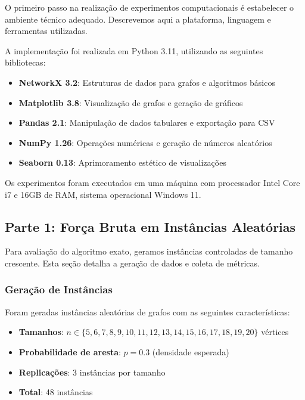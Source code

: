 \documentclass[12pt]{article}
\begin{document}
O primeiro passo na realização de experimentos computacionais é estabelecer o ambiente técnico adequado. Descrevemos aqui a plataforma, linguagem e ferramentas utilizadas.

A implementação foi realizada em Python 3.11, utilizando as seguintes bibliotecas:

\begin{itemize}
    \item \textbf{NetworkX 3.2}: Estruturas de dados para grafos e algoritmos básicos
    \item \textbf{Matplotlib 3.8}: Visualização de grafos e geração de gráficos
    \item \textbf{Pandas 2.1}: Manipulação de dados tabulares e exportação para CSV
    \item \textbf{NumPy 1.26}: Operações numéricas e geração de números aleatórios
    \item \textbf{Seaborn 0.13}: Aprimoramento estético de visualizações
\end{itemize}

Os experimentos foram executados em uma máquina com processador Intel Core i7 e 16GB de RAM, sistema operacional Windows 11.

\subsection{Parte 1: Força Bruta em Instâncias Aleatórias}

Para avaliação do algoritmo exato, geramos instâncias controladas de tamanho crescente. Esta seção detalha a geração de dados e coleta de métricas.

\subsubsection{Geração de Instâncias}

Foram geradas instâncias aleatórias de grafos com as seguintes características:

\begin{itemize}
    \item \textbf{Tamanhos}: $n \in \{5, 6, 7, 8, 9, 10, 11, 12, 13, 14, 15, 16, 17, 18, 19, 20\}$ vértices
    \item \textbf{Probabilidade de aresta}: $p = 0.3$ (densidade esperada)
    \item \textbf{Replicações}: 3 instâncias por tamanho
    \item \textbf{Total}: 48 instâncias
\end{itemize}
\end{document}
